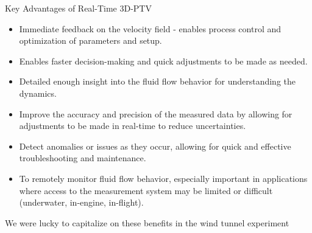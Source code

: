 \begin{frame}{Key Advantages of Real-Time 3D-PTV}

\begin{itemize}
\item Immediate feedback on the velocity field - enables process control and optimization of parameters and setup.
\item Enables faster decision-making and quick adjustments to be made as needed.
\item Detailed enough insight into the fluid flow behavior for understanding the dynamics.
\item Improve the accuracy and precision of the measured data by allowing for adjustments to be made in real-time to reduce uncertainties.
\item Detect anomalies or issues as they occur, allowing for quick and effective troubleshooting and maintenance.
\item To remotely monitor fluid flow behavior, especially important in applications where access to the measurement system may be limited or difficult (underwater, in-engine, in-flight).
\end{itemize}
\end{frame}

\begin{frame}{We were lucky to capitalize on these benefits in the wind tunnel experiment}
\end{frame}






